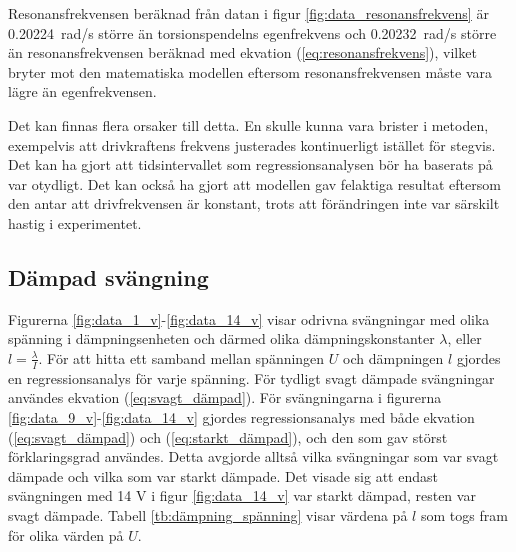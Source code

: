 \documentclass[12pt, a4paper]{article}
\begin{document}
Resonansfrekvensen beräknad från datan i figur \ref{fig:data_resonansfrekvens} är \SI{0.20224}{rad/s} större än torsionspendelns egenfrekvens och \SI{0.20232}{rad/s} större än resonansfrekvensen beräknad med ekvation (\ref{eq:resonansfrekvens}), vilket bryter mot den matematiska modellen eftersom resonansfrekvensen måste vara lägre än egenfrekvensen. 

Det kan finnas flera orsaker till detta. En skulle kunna vara brister i metoden, exempelvis att drivkraftens frekvens justerades kontinuerligt istället för stegvis. Det kan ha gjort att tidsintervallet som regressionsanalysen bör ha baserats på var otydligt. Det kan också ha gjort att modellen gav felaktiga resultat eftersom den antar att drivfrekvensen är konstant, trots att förändringen inte var särskilt hastig i experimentet.

\subsection{Dämpad svängning}
Figurerna \ref{fig:data_1_v}-\ref{fig:data_14_v} visar odrivna svängningar med olika spänning i dämpningsenheten och därmed olika dämpningskonstanter $\lambda$, eller $l=\frac{\lambda}{I}$. För att hitta ett samband mellan spänningen $U$ och dämpningen $l$ gjordes en regressionsanalys för varje spänning. För tydligt svagt dämpade svängningar användes ekvation (\ref{eq:svagt_dämpad}). För svängningarna i figurerna \ref{fig:data_9_v}-\ref{fig:data_14_v} gjordes regressionsanalys med både ekvation (\ref{eq:svagt_dämpad}) och (\ref{eq:starkt_dämpad}), och den som gav störst förklaringsgrad användes. Detta avgjorde alltså vilka svängningar som var svagt dämpade och vilka som var starkt dämpade. Det visade sig att endast svängningen med 14 V i figur \ref{fig:data_14_v} var starkt dämpad, resten var svagt dämpade. Tabell \ref{tb:dämpning_spänning} visar värdena på $l$ som togs fram för olika värden på $U$. 
\end{document}
